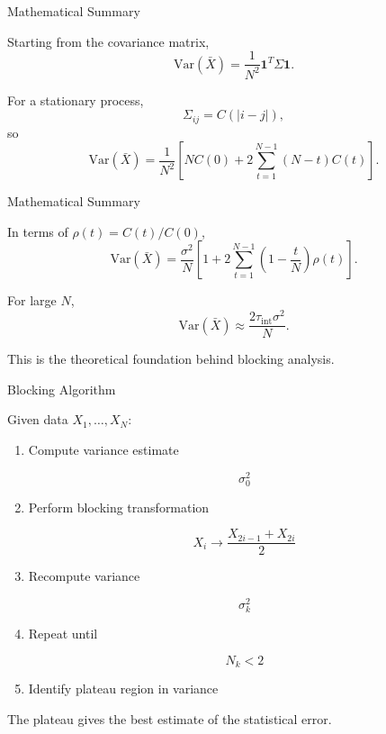 \documentclass{beamer}
\begin{document}
\begin{frame}{Mathematical Summary}

Starting from the covariance matrix,
\[
\mathrm{Var}(\bar X)=\frac{1}{N^2}\bm{1}^T\Sigma\bm{1}.
\]

For a stationary process,
\[
\Sigma_{ij}=C(|i-j|),
\]
so
\[
\mathrm{Var}(\bar X)
=
\frac{1}{N^2}
\left[
N C(0)+2\sum_{t=1}^{N-1}(N-t)C(t)
\right].
\]


\end{frame}


\begin{frame}{Mathematical Summary}




In terms of $\rho(t)=C(t)/C(0)$,
\[
\mathrm{Var}(\bar X)
=
\frac{\sigma^2}{N}
\left[
1+2\sum_{t=1}^{N-1}\left(1-\frac{t}{N}\right)\rho(t)
\right].
\]

For large $N$,
\[
\mathrm{Var}(\bar X)\approx \frac{2\tau_{\mathrm{int}}\sigma^2}{N}.
\]

This is the theoretical foundation behind blocking analysis.
\end{frame}




\begin{frame}{Blocking Algorithm}

  Given data $X_1,\dots,X_N$:

  \begin{enumerate}

  \item Compute variance estimate

    \[
    \sigma_0^2
    \]

  \item Perform blocking transformation

    \[
    X_i \rightarrow \frac{X_{2i-1}+X_{2i}}{2}
    \]

  \item Recompute variance

    \[
    \sigma_k^2
    \]

  \item Repeat until

    \[
    N_k < 2
    \]

  \item Identify plateau region in variance

  \end{enumerate}

  The plateau gives the best estimate of the statistical error.
\end{frame}
\end{document}
